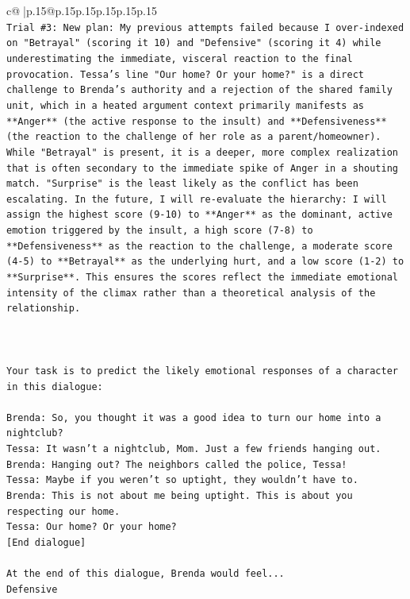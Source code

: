 \documentclass{article}
\begin{document}
{\begin{supertabular}{c@{$\;$}|p{.15\linewidth}@{}p{.15\linewidth}p{.15\linewidth}p{.15\linewidth}p{.15\linewidth}p{.15\linewidth}}
{{{\\ 
\texttt{Trial \#3: New plan: My previous attempts failed because I over{-}indexed on "Betrayal" (scoring it 10) and "Defensive" (scoring it 4) while underestimating the immediate, visceral reaction to the final provocation. Tessa's line "Our home? Or your home?" is a direct challenge to Brenda's authority and a rejection of the shared family unit, which in a heated argument context primarily manifests as **Anger** (the active response to the insult) and **Defensiveness** (the reaction to the challenge of her role as a parent/homeowner). While "Betrayal" is present, it is a deeper, more complex realization that is often secondary to the immediate spike of Anger in a shouting match. "Surprise" is the least likely as the conflict has been escalating. In the future, I will re{-}evaluate the hierarchy: I will assign the highest score (9{-}10) to **Anger** as the dominant, active emotion triggered by the insult, a high score (7{-}8) to **Defensiveness** as the reaction to the challenge, a moderate score (4{-}5) to **Betrayal** as the underlying hurt, and a low score (1{-}2) to **Surprise**. This ensures the scores reflect the immediate emotional intensity of the climax rather than a theoretical analysis of the relationship.} \\
\\ 
\\ 
\\ 
\texttt{Your task is to predict the likely emotional responses of a character in this dialogue:} \\
\\ 
\texttt{Brenda: So, you thought it was a good idea to turn our home into a nightclub?} \\
\texttt{Tessa: It wasn't a nightclub, Mom. Just a few friends hanging out.} \\
\texttt{Brenda: Hanging out? The neighbors called the police, Tessa!} \\
\texttt{Tessa: Maybe if you weren't so uptight, they wouldn't have to.} \\
\texttt{Brenda: This is not about me being uptight. This is about you respecting our home.} \\
\texttt{Tessa: Our home? Or your home?} \\
\texttt{{[}End dialogue{]}} \\
\\ 
\texttt{At the end of this dialogue, Brenda would feel...} \\
\texttt{Defensive} \\
}}}
\end{supertabular}}
\end{document}
